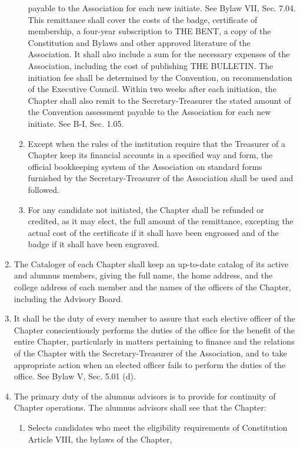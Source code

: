 \begin{optionalpart}
\begin{enumerate}
\begin{enumerate}
payable to the Association for each new initiate. See Bylaw VII, Sec. 7.04. This remittance 
shall cover the costs of the badge, certificate of membership, a four-year subscription to THE
BENT, a copy of the Constitution and Bylaws and other approved literature of the Association. 
It shall also include a sum for the necessary expenses of the Association, including the cost 
of publishing THE BULLETIN. The initiation fee shall be determined by the Convention, 
on recommendation of the Executive Council. Within two weeks after each initiation, the 
Chapter shall also remit to the Secretary-Treasurer the stated amount of the Convention 
assessment payable to the Association for each new initiate. See B-I, Sec. 1.05.
\item Except when the rules of the institution require that the Treasurer of a Chapter 
keep its financial accounts in a specified way and form, the official bookkeeping system of 
the Association on standard forms furnished by the Secretary-Treasurer of the Association 
shall be used and followed.
\item For any candidate not initiated, the Chapter shall be refunded or credited, as it may 
elect, the full amount of the remittance, excepting the actual cost of the certificate if it shall 
have been engrossed and of the badge if it shall have been engraved.
\end{enumerate}
\item The Cataloger of each Chapter shall keep an up-to-date catalog of its active and 
alumnus members, giving the full name, the home address, and the college address of each 
member and the names of the officers of the Chapter, including the Advisory Board.
\item It shall be the duty of every member to assure that each elective officer of the Chapter conscientiously performs the duties of the office for the benefit of the entire Chapter, 
particularly in matters pertaining to finance and the relations of the Chapter with the Secretary-Treasurer of the Association, and to take appropriate action when an elected officer 
fails to perform the duties of the office. See Bylaw V, Sec. 5.01 (d).
\item The primary duty of the alumnus advisors is to provide for continuity of Chapter 
operations. The alumnus advisors shall see that the Chapter:
\begin{enumerate}
\item Selects candidates who 
meet the eligibility requirements of Constitution Article VIII, the bylaws of the Chapter, 

\end{enumerate}
\end{enumerate}
\end{optionalpart}
